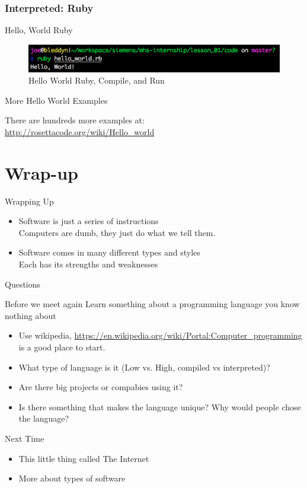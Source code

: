 \documentclass[serif,mathserif,compress]{beamer}
\begin{document}
\subsubsection{Interpreted: Ruby}
\begin{frame}[fragile]{Hello, World Ruby}
  
  \pause

  \begin{figure}
  \centering
  \includegraphics[width=\textwidth]{images/hello-world-ruby.png}
  \caption{Hello World Ruby, Compile, and Run}
  \label{fig:hello-world-ruby-output}
  \end{figure}
\end{frame}

\begin{frame}{More Hello World Examples}
  \begin{center}
    There are hundreds more examples at: \\
    \url{http://rosettacode.org/wiki/Hello_world}
  \end{center}
\end{frame}

\section{Wrap-up}

\begin{frame}{Wrapping Up}
  \begin{itemize}
    \item Software is just a series of instructions\\Computers are dumb, they just do what we tell them.
    \item Software comes in many different types and styles\\Each has its strengths and weaknesses
  \end{itemize}
\end{frame}

\begin{frame}{Questions}
\end{frame}

\begin{frame}{Before we meet again}
  Learn something about a programming language you know nothing about
  \begin{itemize}
    \item Use wikipedia, \url{https://en.wikipedia.org/wiki/Portal:Computer_programming} is a good place to start.
    \item What type of language is it (Low vs. High, compiled vs interpreted)?
    \item Are there big projects or compabies using it?
    \item Is there something that makes the language unique? Why would people chose the language?
  \end{itemize}
\end{frame}

\begin{frame}{Next Time}
  \begin{itemize}
    \item This little thing called The Internet
    \item More about types of software
  \end{itemize}
\end{frame}
\end{document}
